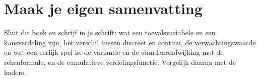 \begin{oefeningen}

\end{oefeningen}


\begin{oefeningen}





\end{oefeningen}


\ifzelfstudie
\section*{Maak je eigen samenvatting}
Sluit dit boek en schrijf in je schrift: wat een toevalsvariabele en een kansverdeling zijn, het verschil tussen discreet en continu, de verwachtingswaarde en wat een eerlijk spel is, de variantie en de standaardafwijking met de rekenformule, en de cumulatieve verdelingsfunctie. Vergelijk daarna met de kaders.
\fi
